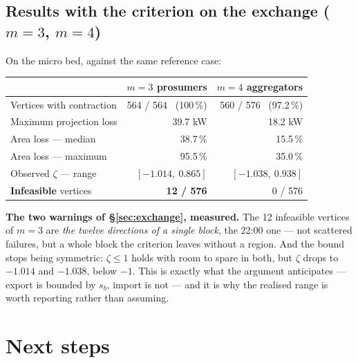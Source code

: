 \documentclass[11pt,a4paper]{article}
\begin{document}
\subsection{Results with the criterion on the exchange ($m=3$, $m=4$)}

On the micro bed, against the same reference case:

\begin{center}\small
\begin{tabular}{l r r}
\toprule
& $m=3$ \textbf{prosumers} & $m=4$ \textbf{aggregators}\\
\midrule
Vertices with contraction & 564 / 564 \ (100\,\%) & 560 / 576 \ (97.2\,\%)\\
Maximum projection loss & 39.7 kW & 18.2 kW\\
Area loss --- median & 38.7\,\% & 15.5\,\%\\
Area loss --- maximum & 95.5\,\% & 35.0\,\%\\
Observed $\zeta$ --- range & $[-1.014,\ 0.865]$ & $[-1.038,\ 0.938]$\\
\textbf{Infeasible} vertices & \textbf{12 / 576} & 0 / 576\\
\bottomrule
\end{tabular}
\end{center}

\begin{keybox}
\textbf{The two warnings of \S\ref{sec:exchange}, measured.} The 12 infeasible vertices of $m=3$ are
\emph{the twelve directions of a single block}, the 22:00 one --- not scattered failures, but a whole
block the criterion leaves without a region. And the bound stops being symmetric: $\zeta\le1$ holds
with room to spare in both, but $\zeta$ drops to $-1.014$ and $-1.038$, below $-1$. This is exactly
what the argument anticipates --- export is bounded by $s_b$, import is not --- and it is why the
realised range is worth reporting rather than assuming.
\end{keybox}


\section{Next steps}
\end{document}
